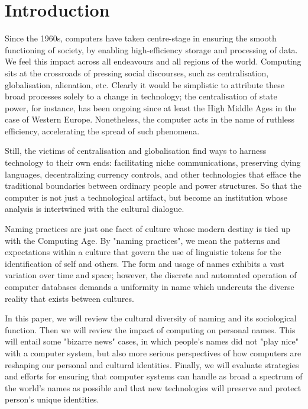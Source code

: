 \section{Introduction}

Since the 1960s, computers have taken centre-stage in ensuring the smooth
functioning of society, by enabling high-efficiency storage and processing of
data. We feel this impact across all endeavours and all regions of the world.
Computing sits at the crossroads of pressing social discourses, such as
centralisation, globalisation, alienation, etc. Clearly it would be simplistic
to attribute these broad processes solely to a change in technology; the
centralisation of state power, for instance, has been ongoing since at least the
High Middle Ages in the case of Western Europe. Nonetheless, the computer acts
in the name of ruthless efficiency, accelerating the spread of such phenomena.

Still, the victims of centralisation and globalisation find ways to harness
technology to their own ends: facilitating niche communications, preserving
dying languages, decentralizing currency controls, and other technologies that
efface the traditional boundaries between ordinary people and power structures.
So that the computer is not just a technological artifact, but become an
institution whose analysis is intertwined with the cultural dialogue.

Naming practices are just one facet of culture whose modern destiny is tied up
with the Computing Age. By "naming practices", we mean the patterns and
expectations within a culture that govern the use of linguistic tokens for the
identification of self and others. The form and usage of names exhibits a vast
variation over time and space; however, the discrete and automated operation of
computer databases demands a uniformity in name which undercuts the diverse
reality that exists between cultures.

In this paper, we will review the cultural diversity of naming and its
sociological function. Then we will review the impact of computing on personal
names. This will entail some "bizarre news" cases, in which people's names did
not "play nice" with a computer system, but also more serious perspectives of
how computers are reshaping our personal and cultural identities. Finally, we
will evaluate strategies and efforts for ensuring that computer systems can
handle as broad a spectrum of the world's names as possible and that new
technologies will preserve and protect person's unique identities.
